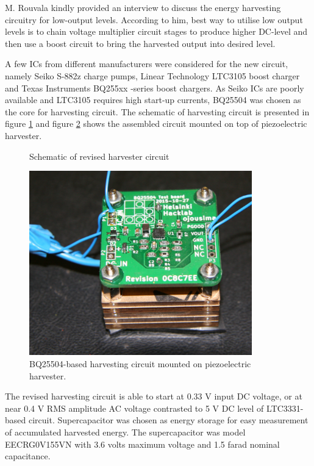 M. Rouvala kindly provided an interview \cite{Rouvala2015} to discuss the energy harvesting circuitry for low-output levels. According to him, best way to utilise low output levels is to chain voltage multiplier circuit stages to produce higher DC-level and then use a boost circuit to bring the harvested output into desired level. 

A few ICs from different manufacturers were considered for the new circuit, namely Seiko S-882z \cite{SeikoInstruments2010} charge pumps, Linear Technology LTC3105 \cite{ltc3015} boost charger and Texas Instruments BQ255xx -series boost chargers. As Seiko ICs are poorly available and LTC3105 requires high start-up currents, BQ25504 \cite{bq25504} was chosen as the core for harvesting circuit. The schematic of harvesting circuit is presented in figure \ref{fig:bq25504} and figure \ref{fig:bq25504_mounted} shows the assembled circuit mounted on top of piezoelectric harvester.


\begin{figure}
    \centering
    \def\svgwidth{\columnwidth}
    
    \caption{\label{fig:bq25504} Schematic of revised harvester circuit}
\end{figure}

\begin{figure}[htb]
\begin{center}
\includegraphics[height=8cm]{images/own_pic/tyre_fixture/piezo_bq_desk.jpg}
\end{center}
\caption{\label{fig:bq25504_mounted} BQ25504-based harvesting circuit mounted on piezoelectric harvester.}
\end{figure}

The revised harvesting circuit is able to start at 0.33 V input DC voltage, or at near 0.4 V RMS amplitude AC voltage contrasted to 5 V DC level of LTC3331-based circuit. Supercapacitor was chosen as energy storage for easy measurement of accumulated harvested energy. The supercapacitor was model EECRG0V155VN \cite{panasonic_scap} with 3.6 volts maximum voltage and 1.5 farad nominal capacitance. 

